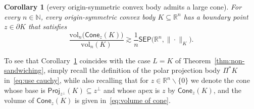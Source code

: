 \documentclass[11pt,reqno]{amsart}
\renewcommand{\ge}{\geqslant}
\renewcommand{\setminus}{\smallsetminus}
\newcommand{\evr}{\mathrm{evr}}
\newcommand{\proj}{\mathsf{Proj}}
\newcommand{\R}{\mathbb R}
\newtheorem{corollary}[theorem]{Corollary}
\theoremstyle{remark}
\renewcommand{\subset}{\subseteq}
\newcommand{\N}{\mathbb N}
\newcommand{\vol}{\mathrm{vol}}
\renewcommand{\1}{\mathbf 1}
\newcommand{\cone}{\mathsf{Cone}}
\newcommand{\sep}{\mathsf{SEP}}
\begin{document}
\begin{corollary}[every origin-symmetric convex body admits a large cone]\label{cor:big cone sep} For every $n\in \N$, every origin-symmetric convex body $K\subset \R^n$ has a boundary point $z\in \partial K$ that satisfies
\begin{equation}\label{eq:large cone sep}
\frac{\vol_n\big(\cone_z(K)\big)}{\vol_n(K)}\gtrsim \frac{1}{n}\sep\big(\R^n,\|\cdot\|_K\big).
\end{equation}
\end{corollary}
To see that Corollary~\ref{cor:big cone sep}  coincides with the case $L=K$ of Theorem~\ref{thm:non-sandwiching},  simply recall the definition of the polar projection body $\Pi^* K$ in~\eqref{eq:use cauchy}, while also recalling that for $z\in \R^n\setminus \{0\}$ we denote  the cone whose base is $\proj_{z^{\perp}}(K)\subset z^\perp$ and whose apex is $z$ by $\cone_z(K)$, and the volume of $\cone_z(K)$ is given in~\eqref{eq:volume of cone}.

\end{document}
